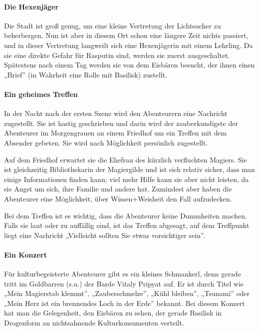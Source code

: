\documentclass[a4paper,10pt]{scrartcl}
\def\drugname{Basilisk}
\begin{document}
\paragraph{Die Hexenjäger}

Die Stadt ist groß genug, um eine kleine Vertretung der Lichtsucher zu
beherbergen. Nun ist aber in diesem Ort schon eine längere Zeit nichts
passiert, und in dieser Vertretung langweilt sich eine Hexenjägerin mit
einem Lehrling. Da sie eine direkte Gefahr für Rasputin sind, werden sie
zuerst ausgeschaltet. Spätestens nach einem Tag werden sie von dem
Eisbären besucht, der ihnen einen „Brief” (in Wahrheit eine Rolle mit
\drugname{}) zustellt.

\paragraph{Ein geheimes Treffen}

In der Nacht nach der ersten Szene wird den Abenteurern eine Nachricht 
zugestellt. Sie ist hastig geschrieben und darin wird der zauberkundigste der 
Abenteurer im Morgengrauen an einem Friedhof um ein Treffen mit dem Absender 
gebeten. Sie wird nach Möglichkeit persönlich zugestellt.

Auf dem Friedhof erwartet sie die Ehefrau des kürzlich verfluchten
Magiers.  Sie ist gleichzeitig Bibliothekarin der Magiergilde und ist
sich relativ sicher, dass man einige Informationen finden kann; viel
mehr Hilfe kann sie aber nicht leisten, da sie Angst um sich, ihre
Familie und andere hat.  Zumindest aber haben die Abenteurer eine
Möglichkeit, über Wissen+Weisheit den Fall aufzudecken. 

Bei dem Treffen ist es wichtig, dass die Abenteurer keine Dummheiten
machen. Falls sie laut oder zu auffällig sind, ist das Treffen
abgesagt, auf dem Treffpunkt liegt eine Nachricht „Vielleicht sollten
Sie etwas vorsichtiger sein”.

\paragraph{Ein Konzert}

Für kulturbegeisterte Abenteurer gibt es ein kleines Schmankerl, denn
gerade tritt im Goldbarren (s.u.) der Barde Vitaly Pripyat auf. Er ist
durch Titel wie „Mein Magierstab klemmt”, „Zauberschmelze”, „Kühl
bleiben”, „Tsunami” oder „Mein Herz ist ein brennendes Loch in der Erde”
bekannt. Bei diesem Konzert hat man die Gelegenheit, den Eisbären zu
sehen, der gerade \drugname{} in Drogenform an nichtsahnende
Kulturkonsumenten verteilt.
\end{document}
